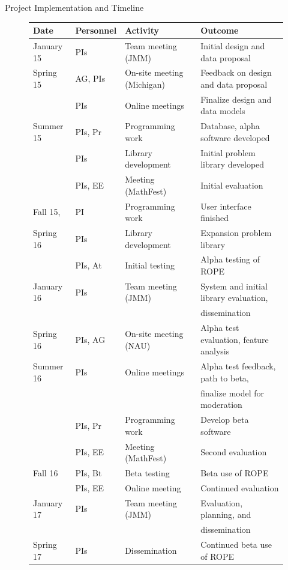 \documentclass[11pt]{article}
\begin{document}
\begin{section}{Project Implementation and Timeline}
\begin{figure}
\begin{center}
\begin{tabular}{|l|l|l|l|}
  \hline
  \textbf{Date} & \textbf{Personnel} & \textbf{Activity} & \textbf{Outcome}\\
  \hline
  \hline
  January 15 & PIs & Team meeting (JMM) & Initial design and data proposal\\
  \hline
  Spring 15 & AG, PIs & On-site meeting (Michigan)
	& Feedback on design and data proposal\\
	& PIs & Online meetings & Finalize design and data models\\
  \hline
  Summer 15 & PIs, Pr & Programming work & Database, alpha
	software developed \\ 
	& PIs & Library development & Initial problem library developed \\
	& PIs, EE & Meeting (MathFest) & Initial evaluation \\
  \hline
  Fall 15, & PI & Programming work & User interface finished \\ 
  Spring 16 & PIs & Library development & Expansion problem library \\
	& PIs, At & Initial testing & Alpha testing of ROPE \\
  \hline 
  January 16 & PIs & Team meeting (JMM) & System and initial library evaluation, \\
        &  & & dissemination \\
  \hline
  Spring 16 & PIs, AG & On-site meeting (NAU) & Alpha test evaluation,
        feature analysis \\
  \hline
  Summer 16 & PIs & Online meetings &
 	Alpha test feedback, path to beta, \\
	& & & finalize model for moderation \\
	& PIs, Pr & Programming work & Develop beta software \\
        & PIs, EE & Meeting (MathFest) & Second evaluation \\
  \hline
  Fall 16 & PIs, Bt & Beta testing & Beta use of ROPE \\
	& PIs, EE & Online meeting & Continued evaluation \\
  \hline
  January 17 & PIs & Team meeting (JMM) & Evaluation, planning, and \\
        & & & dissemination \\
  \hline
  Spring 17 & PIs & Dissemination & Continued beta use of ROPE \\

\end{tabular}
\end{center}
\end{figure}
\end{section}
\end{document}

